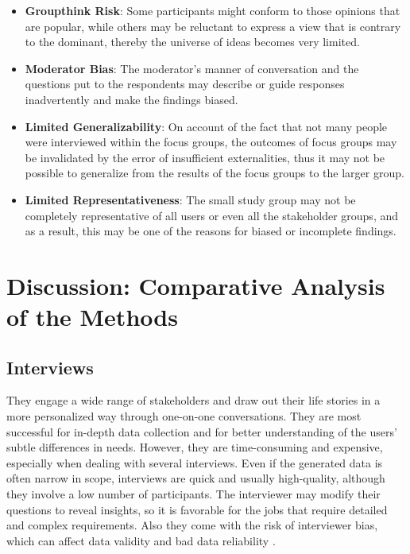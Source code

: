 \documentclass[conference]{IEEEtran}
\begin{document}
\begin{itemize}
    \item \textbf{Groupthink Risk}: Some participants might conform to those opinions that are popular, while others may be reluctant to express a view that is contrary to the dominant, thereby the universe of ideas becomes very limited.
    \item \textbf{Moderator Bias}: The moderator’s manner of conversation and the questions put to the respondents may describe or guide responses inadvertently and make the findings biased.
    \item \textbf{Limited Generalizability}: On account of the fact that not many people were interviewed within the focus groups, the outcomes of focus groups may be invalidated by the error of insufficient externalities, thus it may not be possible to generalize from the results of the focus groups to the larger group.
    \item \textbf{Limited Representativeness}: The small study group may not be completely representative of all users or even all the stakeholder groups, and as a result, this may be one of the reasons for biased or incomplete findings.
\end{itemize}


\section{Discussion: Comparative Analysis of the Methods}

\subsection*{Interviews}
They engage a wide range of stakeholders and draw out their life stories in a more personalized way through one-on-one conversations. They are most successful for in-depth data collection and for better understanding of the users' subtle differences in needs. However, they are time-consuming and expensive, especially when dealing with several interviews. Even if the generated data is often narrow in scope, interviews are quick and usually high-quality, although they involve a low number of participants. The interviewer may modify their questions to reveal insights, so it is favorable for the jobs that require detailed and complex requirements. Also they come with the risk of interviewer bias, which can affect data validity and bad data reliability \cite{cite15}.
\end{document}
